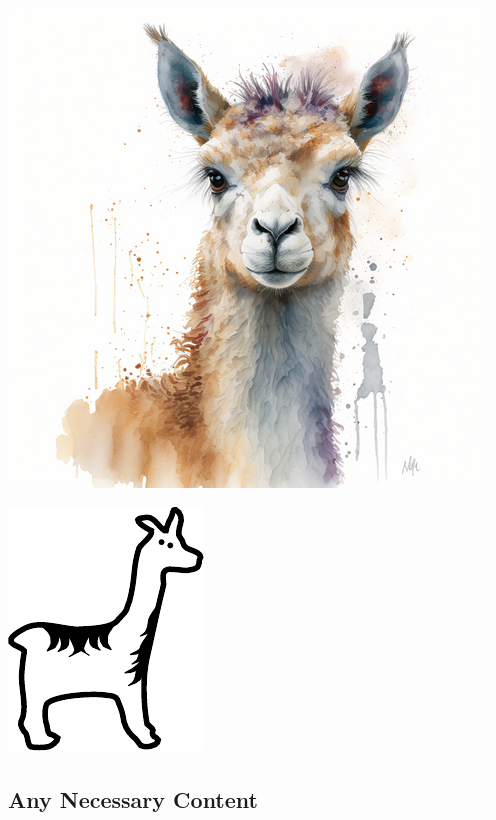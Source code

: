 \documentclass{ximera}
\begin{document}
\begin{center}
  \includegraphics{llama.png}
\end{center}


\begin{center}
  \includegraphics{llama.pdf}
\end{center}




    \subsection*{Any Necessary Content}
    
    
    
\end{document}
